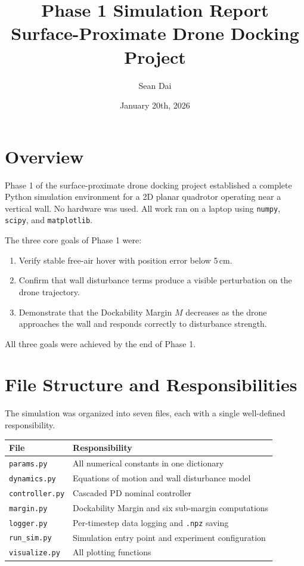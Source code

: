 \documentclass[12pt]{article}
\title{\textbf{Phase 1 Simulation Report} \\
\large Surface-Proximate Drone Docking Project}
\author{Sean Dai}
\date{January 20th, 2026}
\begin{document}
\maketitle
\tableofcontents
\newpage

\section{Overview}

Phase 1 of the surface-proximate drone docking project established a
complete Python simulation environment for a 2D planar quadrotor operating
near a vertical wall. No hardware was used. All work ran on a laptop using
\texttt{numpy}, \texttt{scipy}, and \texttt{matplotlib}.

The three core goals of Phase 1 were:

\begin{enumerate}
    \item Verify stable free-air hover with position error below 5\,cm.
    \item Confirm that wall disturbance terms produce a visible perturbation
          on the drone trajectory.
    \item Demonstrate that the Dockability Margin $M$ decreases as the drone
          approaches the wall and responds correctly to disturbance strength.
\end{enumerate}

All three goals were achieved by the end of Phase 1.

\section{File Structure and Responsibilities}

The simulation was organized into seven files, each with a single
well-defined responsibility.

\begin{center}
\begin{tabular}{ll}
\toprule
\textbf{File} & \textbf{Responsibility} \\
\midrule
\texttt{params.py}     & All numerical constants in one dictionary \\
\texttt{dynamics.py}   & Equations of motion and wall disturbance model \\
\texttt{controller.py} & Cascaded PD nominal controller \\
\texttt{margin.py}     & Dockability Margin and six sub-margin computations \\
\texttt{logger.py}     & Per-timestep data logging and \texttt{.npz} saving \\
\texttt{run\_sim.py}   & Simulation entry point and experiment configuration \\
\texttt{visualize.py}  & All plotting functions \\
\bottomrule
\end{tabular}
\end{center}
\end{document}
